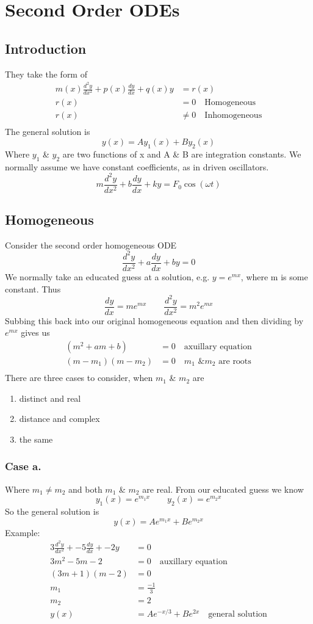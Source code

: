 \documentclass{article}
\newcommand{\ODE}[3]{#1\frac{d^2y}{dx^2} + #2\frac{dy}{dx} + #3y}
\begin{document}
\newpage
\section{Second Order ODEs}

\subsection{Introduction}
They take the form of
\begin{align*}
    m(x)\frac{d^2y}{dx^2} + p(x)\frac{dy}{dx} + q(x)y &= r(x)\\
    r(x) &= 0 \quad\text{Homogeneous}\\
    r(x) &\not= 0 \quad\text{Inhomogeneous}\\
\end{align*}
The general solution is 
$$y(x) = Ay_1(x) + By_2(x)$$
Where $y_1$ \& $y_2$ are two functions of x and A \& B are integration constants.
We normally assume we have constant coefficients, as in driven oscillators.
$$m\frac{d^2y}{dx^2} + b\frac{dy}{dx} + ky = F_0\cos(\omega t)$$

\subsection{Homogeneous}
Consider the second order homogeneous ODE
$$\ODE{}{a}{b} = 0$$
We normally take an educated guess at a solution, e.g. $y=e^{mx}$, where m is some constant. Thus 
$$\frac{dy}{dx} = me^{mx} \quad\quad \frac{d^2y}{dx^2} = m^2e^{mx}$$
Subbing this back into our original homogeneous equation and then dividing by $e^{mx}$ gives us
\begin{align*}
    (m^2 + am + b) &= 0 \quad\text{axuillary equation}\\
    (m-m_1)(m-m_2) &= 0 \quad\text{$m_1$ \& $m_2$ are roots}\\
\end{align*}
There are three cases to consider, when $m_1$ \& $m_2$ are 
\begin{enumerate}[label=\alph*.]
    \item distinct and real 
    \item distance and complex
    \item the same
\end{enumerate}

\subsubsection{Case a.}
Where $m_1 \not= m_2$ and both $m_1$ \& $m_2$ are real. From our educated guess we know
$$y_1(x) = e^{m_1x} \quad\quad y_2(x) = e^{m_2x}$$
So the general solution is 
$$y(x) = Ae^{m_1x} + Be^{m_2x}$$
Example:
\begin{align*}
    \ODE{3}{-5}{-2} &= 0\\
    3m^2 - 5m - 2 &= 0 \quad\text{auxillary equation}\\
    (3m+1)(m-2) &= 0\\
    m_1 &= \frac{-1}{3}\\
    m_2 &= 2\\
    y(x) &= Ae^{-x/3} + Be^{2x} \quad\text{general solution}
\end{align*}
\end{document}
